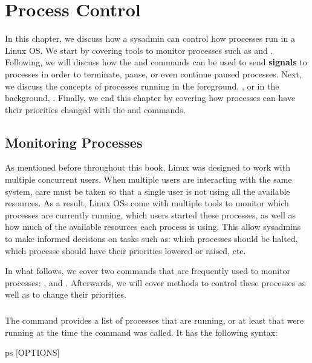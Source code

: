 \chapter{Process Control}\label{ch:processes}

In this chapter, we discuss how a sysadmin can control how processes run in a Linux \acs{OS}. We start by covering tools to monitor processes such as  and . Following, we will discuss how the  and  commands can be used to send \textbf{signals} to processes in order to terminate, pause, or even continue paused processes. Next, we discuss the concepts of processes running in the foreground, , or in the background, . Finally, we end this chapter by covering how processes can have their priorities changed with the  and  commands.

\section{Monitoring Processes}

As mentioned  before throughout this book, Linux was designed to work with multiple concurrent users. When multiple users are interacting with the same system, care must be taken so that a single user is not using all the available resources. As a result, Linux \acs{OS}s come with multiple tools to monitor which processes are currently running, which users started these processes, as well as how much of the available resources each process is using. This allow sysadmins to make informed decisions on tasks such as: which processes should be halted, which processe should have their priorities lowered or raised, etc.

In what follows, we cover two commands that are frequently used to monitor processes: , and . Afterwards, we will cover methods to control these processes as well as to change their priorities. 

\subsection{}

The  command provides a list of processes that are running, or at least that were running at the time the command was called. It has the following syntax:
\begin{command_line}[make]
ps [OPTIONS] 
\end{command_line}

